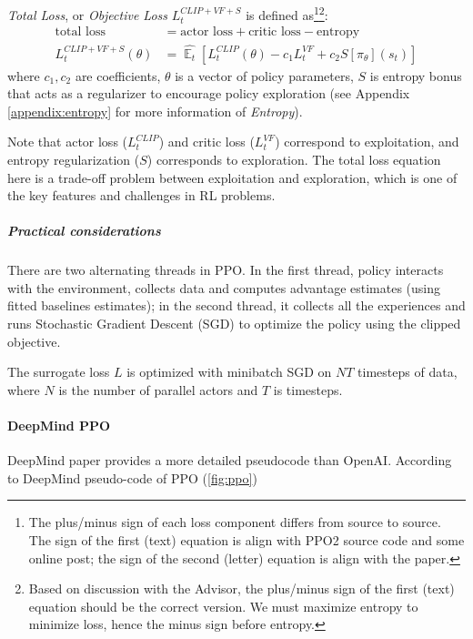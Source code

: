 \documentclass[lang=en,mode=normal,device=normal,color=blue,12pt]{elegantnote}
\DeclareMathOperator*{\1}{\mathbbm{1}}
\DeclareMathOperator*{\E}{\mathbb{E}}
\begin{document}
\textit{Total Loss}, or \textit{Objective Loss} $L_t^{CLIP+VF+S}$ is defined as\footnote{The plus/minus sign of each loss component differs from source to source. The sign of the first (text) equation is align with PPO2 source code and some online post; the sign of the second (letter) equation is align with the paper.}\footnote{Based on discussion with the Advisor, the plus/minus sign of the first (text) equation should be the correct version. We must maximize entropy to minimize loss, hence the minus sign before entropy.}:
\begin{align*}
\text{total loss} & = \text{actor loss} + \text{critic loss} - \text{entropy} \\
L_t^{CLIP+VF+S}(\theta) & = \hat{\E_t} [L_t^{CLIP}(\theta) - c_1 L_t^{VF} + c_2 S[\pi_\theta](s_t)]
\end{align*}
where $c_1, c_2$ are coefficients, $\theta$ is a vector of policy parameters, $S$ is entropy bonus that acts as a regularizer to encourage policy exploration (see Appendix \ref{appendix:entropy} for more information of \textit{Entropy}).

Note that actor loss ($L_t^{CLIP}$) and critic loss ($L_t^{VF}$) correspond to exploitation, and entropy regularization ($S$) corresponds to exploration. The total loss equation here is a trade-off problem between exploitation and exploration, which is one of the key features and challenges in RL problems.


\subparagraph{Practical considerations}

There are two alternating threads in PPO. In the first thread, policy interacts with the environment, collects data and computes advantage estimates (using fitted baselines estimates); in the second thread, it collects all the experiences and runs Stochastic Gradient Descent (SGD) to optimize the policy using the clipped objective.

The surrogate loss $L$ is optimized with minibatch SGD on $NT$ timesteps of data, where $N$ is the number of parallel actors and $T$ is timesteps.



\paragraph{DeepMind PPO}

DeepMind paper provides a more detailed pseudocode than OpenAI. According to DeepMind pseudo-code of PPO (\ref{fig:ppo})
\end{document}
